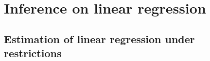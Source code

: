 

\chapter{Inference on linear regression}

\section{Estimation of linear regression under restrictions}

